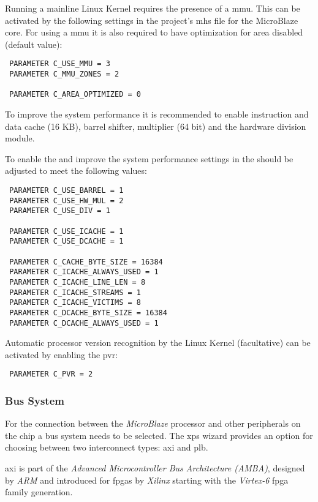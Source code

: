 Running a mainline Linux Kernel requires the presence of a \gls{mmu}. This can be activated by the following settings in the project's \gls{mhs} file for the MicroBlaze core. For using a \gls{mmu} it is also required to have optimization for area disabled (default value):

\begin{verbatim}
 PARAMETER C_USE_MMU = 3
 PARAMETER C_MMU_ZONES = 2
 
 PARAMETER C_AREA_OPTIMIZED = 0
\end{verbatim}

To improve the system performance it is recommended to enable instruction and data cache (16 KB), barrel shifter, multiplier (64 bit) and the hardware division module.

To enable the  and improve the system performance settings  in the  should be adjusted to meet the following values:

\begin{verbatim}
 PARAMETER C_USE_BARREL = 1
 PARAMETER C_USE_HW_MUL = 2
 PARAMETER C_USE_DIV = 1

 PARAMETER C_USE_ICACHE = 1
 PARAMETER C_USE_DCACHE = 1

 PARAMETER C_CACHE_BYTE_SIZE = 16384
 PARAMETER C_ICACHE_ALWAYS_USED = 1
 PARAMETER C_ICACHE_LINE_LEN = 8
 PARAMETER C_ICACHE_STREAMS = 1
 PARAMETER C_ICACHE_VICTIMS = 8
 PARAMETER C_DCACHE_BYTE_SIZE = 16384
 PARAMETER C_DCACHE_ALWAYS_USED = 1
\end{verbatim}

Automatic processor version recognition by the Linux Kernel (facultative) can be activated by enabling the \gls{pvr}:

\begin{verbatim}
 PARAMETER C_PVR = 2
\end{verbatim}

\subsubsection{Bus System}

For the connection between the \textit{MicroBlaze} processor and other peripherals on the chip a bus system needs to be selected. The \gls{xps} wizard provides an option for choosing between two interconnect types: \gls{axi} and \gls{plb}.

\gls{axi} is part of the \textit{Advanced Microcontroller Bus Architecture (AMBA)}, designed by \textit{ARM} and introduced for \gls{fpga}s by \textit{Xilinx} starting with the \textit{Virtex-6} \gls{fpga} family generation.

